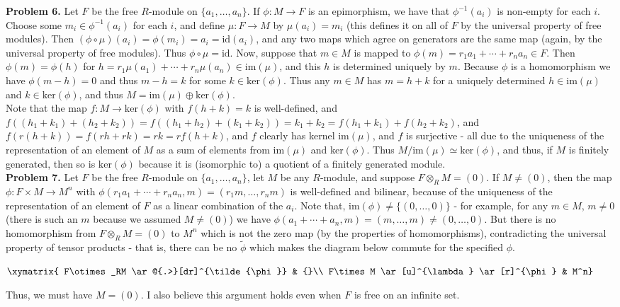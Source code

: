 \documentclass[11pt]{article}
\newcommand{\num}[1]{\noindent \textbf{#1}}
\theoremstyle{definition}
\begin{document}
\num{Problem 6.} Let $F$ be the free $R$-module on $\{a_1,\ldots,a_n\}$. If
$\phi:M\rightarrow F$ is an epimorphism, we have that $\phi^{-1}(a_i)$
is non-empty for each $i$. Choose some $m_i\in\phi^{-1}(a_i)$ for each
$i$, and define $\mu:F\rightarrow M$ by $\mu(a_i)=m_i$ (this defines
it on all of $F$ by the universal property of free modules). Then
$(\phi\circ\mu)(a_i)=\phi(m_i)=a_i=\text{id}(a_i)$, and any two maps which
agree on generators are the same map (again, by the universal property of
free modules). Thus $\phi\circ\mu=\text{id}$. Now, suppose that $m\in M$
is mapped to $\phi(m)=r_1a_1+\cdots+r_na_n\in F$. Then $\phi(m)=\phi(h)$
for $h=r_1\mu(a_1)+\cdots+r_n\mu(a_n)\in \text{im}(\mu)$, and this $h$
is determined uniquely by $m$. Because $\phi$ is a homomorphism we have
$\phi(m-h)=0$ and thus $m-h=k$ for some $k\in \text{ker}(\phi)$. Thus any
$m\in M$ has $m=h+k$ for a uniquely determined $h\in\text{im}(\mu)$ and
$k\in\text{ker}(\phi)$, and thus $M=\text{im}(\mu)\oplus\text{ker}(\phi)$.\\

\noindent Note that the map $f:M\rightarrow\text{ker}(\phi)$
with $f(h+k)=k$ is well-defined, and
$f((h_1+k_1)+(h_2+k_2))=f((h_1+h_2)+(k_1+k_2))=k_1+k_2=f(h_1+k_1)+f(h_2+k_2)$,
and  $f(r(h+k))=f(rh+rk)=rk=rf(h+k)$, and $f$ clearly has kernel
$\text{im}(\mu)$, and $f$ is surjective - all due to the uniqueness of the
representation of an element of $M$ as a sum of elements from im$(\mu)$
and ker$(\phi)$. Thus $M/\text{im}(\mu)\simeq \text{ker}(\phi)$, and thus,
if $M$ is finitely generated, then so is $\text{ker}(\phi)$ because it is
(isomorphic to) a quotient of a finitely generated module.\\

\num{Problem 7.} Let $F$ be the free $R$-module on $\{a_1,\ldots,a_n\}$,
let $M$ be any $R$-module, and suppose $F\otimes_R M=(0)$. If
$M\neq(0)$, then the map $\phi:F\times M\rightarrow M^n$ with
$\phi(r_1a_1+\cdots+r_na_n,m)=(r_1m,\ldots,r_nm)$ is well-defined
and bilinear, because of the uniqueness of the representation of
an element of $F$ as a linear combination of the $a_i$. Note that,
im$(\phi)\neq\{(0,\ldots,0)\}$ - for example, for any $m\in M$,
$m\neq 0$ (there is such an $m$ because we assumed $M\neq(0)$) we have
$\phi(a_1+\cdots+a_n,m)=(m,\ldots,m)\neq(0,\ldots,0)$. But there is no
homomorphism from $F\otimes_RM=(0)$ to $M^n$ which is not the zero map (by
the properties of homomorphisms), contradicting the universal property of
tensor products - that is, there can be no $\tilde{\phi}$ which makes the
diagram below commute for the specified $\phi$.\\

\begin{center}
$\xymatrix{
F\otimes_RM \ar@{.>}[dr]^{\tilde{\phi}} & {}\\
F\times M \ar[u]^{\lambda} \ar[r]^{\phi} & M^n}$\\
\end{center}   

\noindent Thus, we must have $M=(0)$. I also believe this argument holds
even when $F$ is free on an infinite set.
\end{document}

